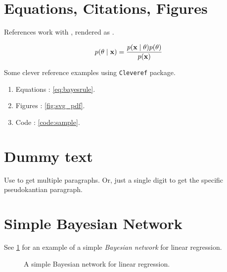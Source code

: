 \documentclass{article}
\begin{document}
\section{Equations, Citations, Figures}

References work with , rendered as \citet{vargp2020}.

\begin{align}
p(\theta \mid {\ensuremath{\boldsymbol{\mathbf{x}}}}) = \frac{p({\boldsymbol{\mathbf{x}}}\mid\theta)p(\theta)}{p({\boldsymbol{\mathbf{x}}})} \label{eq:bayesrule}
\end{align}

Some clever reference examples using \texttt{Cleveref} package.

\begin{enumerate}
\item Equations : \cref{eq:bayesrule}.
\item Figures : \cref{fig:svg_pdf}.
\item Code : \cref{code:sample}.
\end{enumerate}

\section{Dummy text}

Use \vrb{\kant[1-3]} to get multiple paragraphs. Or, just a single digit to get the specific pseudokantian paragraph.

\kant[1-3]

\section{Simple Bayesian Network}

See \cref{fig:bayes_net} for an example of a simple \emph{Bayesian network} for linear regression.

\begin{figure}[ht]
    \centering
{}
    \caption{A simple Bayesian network for linear regression.}
    \label{fig:bayes_net}
\end{figure}

% 

\end{document}
